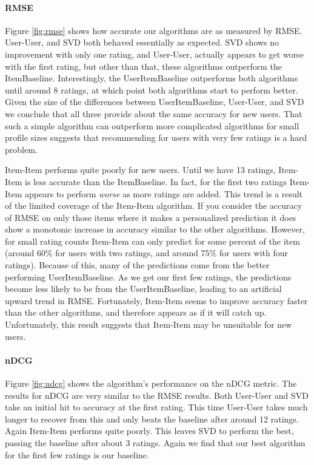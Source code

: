 \documentclass[letterpaper]{sig-alternate}
\begin{document}
  \paragraph{RMSE}
  Figure \ref{fig:rmse} shows how accurate our algorithms are as measured by RMSE.
  User-User, and SVD both behaved essentially as expected.
  SVD shows no improvement with only one rating, and User-User, actually appears to get worse with the first rating, but other than that, these algorithms outperform the ItemBaseline.
  Interestingly, the UserItemBaseline outperforms both algorithms until around 8 ratings, at which point both algorithms start to perform better.
  Given the size of the differences between UserItemBaseline, User-User, and SVD we conclude that all three provide about the same accuracy for new users.
  That such a simple algorithm can outperform more complicated algorithms for small profile sizes suggests that recommending for users with very few ratings is a hard problem.
  
  Item-Item performs quite poorly for new users.
  Until we have 13 ratings, Item-Item is less accurate than the ItemBaseline.
  In fact, for the first two ratings Item-Item appears to perform \emph{worse} as more ratings are added.
  This trend is a result of the limited coverage of the Item-Item algorithm.
  If you consider the accuracy of RMSE on only those items where it makes a personalized prediction it does show a monotonic increase in accuracy similar to the other algorithms.
  However, for small rating counts Item-Item can only predict for some percent of the item (around 60\% for users with two ratings, and around 75\% for users with four ratings).
  Because of this, many of the predictions come from the better performing UserItemBaseline.
  As we get our first few ratings, the predictions become less likely to be from the UserItemBaseline, leading to an artificial upward trend in RMSE.
  Fortunately, Item-Item seems to improve accuracy faster than the other algorithms, and therefore appears as if it will catch up.
  Unfortunately, this result suggests that Item-Item may be unsuitable for new users.


  \paragraph{nDCG}
  Figure \ref{fig:ndcg} shows the algorithm's performance on the nDCG metric.
  The results for nDCG are very similar to the RMSE results.
  Both User-User and SVD take an initial hit to accuracy at the first rating.
  This time User-User takes much longer to recover from this and only beats the baseline after around 12 ratings.
  Again Item-Item performs quite poorly.
  This leaves SVD to perform the best, passing the baseline after about 3 ratings.
  Again we find that our best algorithm for the first few ratings is our baseline.
  
\end{document}
